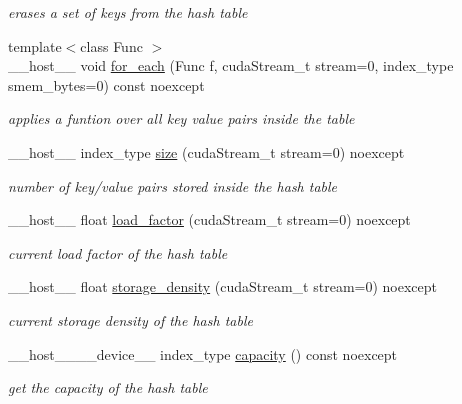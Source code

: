 \begin{DoxyCompactItemize}
\begin{DoxyCompactList}\small\item\em erases a set of keys from the hash table \end{DoxyCompactList}\item 
{\footnotesize template$<$class Func $>$ }\\\+\_\+\+\_\+host\+\_\+\+\_\+ void \hyperlink{classwarpcore_1_1SingleValueHashTable_a8b61ef0d87ebc9c793fc7daaf74835e3}{for\+\_\+each} (Func f, cuda\+Stream\+\_\+t stream=0, index\+\_\+type smem\+\_\+bytes=0) const noexcept
\begin{DoxyCompactList}\small\item\em applies a funtion over all key value pairs inside the table \end{DoxyCompactList}\item 
\+\_\+\+\_\+host\+\_\+\+\_\+ index\+\_\+type \hyperlink{classwarpcore_1_1SingleValueHashTable_a8f4dee48ff8aa87890b767d79b1eb835}{size} (cuda\+Stream\+\_\+t stream=0) noexcept
\begin{DoxyCompactList}\small\item\em number of key/value pairs stored inside the hash table \end{DoxyCompactList}\item 
\+\_\+\+\_\+host\+\_\+\+\_\+ float \hyperlink{classwarpcore_1_1SingleValueHashTable_afc3b7f76eec998a3d4878edf1ae1419b}{load\+\_\+factor} (cuda\+Stream\+\_\+t stream=0) noexcept
\begin{DoxyCompactList}\small\item\em current load factor of the hash table \end{DoxyCompactList}\item 
\+\_\+\+\_\+host\+\_\+\+\_\+ float \hyperlink{classwarpcore_1_1SingleValueHashTable_a9383092375777d800f145b7f2369832d}{storage\+\_\+density} (cuda\+Stream\+\_\+t stream=0) noexcept
\begin{DoxyCompactList}\small\item\em current storage density of the hash table \end{DoxyCompactList}\item 
\+\_\+\+\_\+host\+\_\+\+\_\+\+\_\+\+\_\+device\+\_\+\+\_\+ index\+\_\+type \hyperlink{classwarpcore_1_1SingleValueHashTable_a9804486b8ec4f3c72293e19c722e4df2}{capacity} () const noexcept
\begin{DoxyCompactList}\small\item\em get the capacity of the hash table \end{DoxyCompactList}\item 

\end{DoxyCompactItemize}
